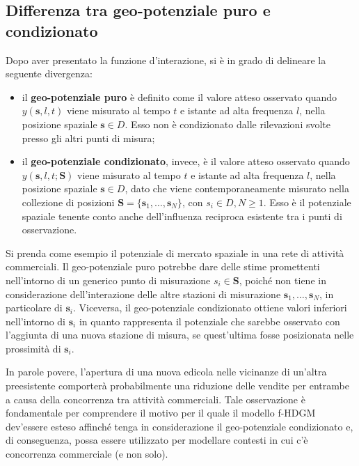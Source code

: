 \subsection[Differenza tra geo-potenziale puro e condizionato]{Differenza tra geo-potenziale puro e condizionato}
Dopo aver presentato la funzione d'interazione, si è in grado di delineare la seguente divergenza:
\begin{itemize}
	\item il \textbf{geo-potenziale puro} è definito come  il valore atteso osservato quando $y(\mathbf{s}, l, t)$ viene misurato al tempo $t$ e istante ad alta frequenza $l$, nella posizione spaziale $\mathbf{s} \in D$. Esso non è condizionato dalle rilevazioni svolte presso gli altri punti di misura;
	\item il \textbf{geo-potenziale condizionato}, invece, è il valore atteso osservato quando $y(\mathbf{s}, l, t; \mathbf{S})$
	viene misurato al tempo $t$ e istante ad alta frequenza $l$, nella posizione spaziale $\mathbf{s} \in D$, dato che viene contemporaneamente misurato nella collezione di posizioni $\mathbf{S} = \{\mathbf{s}_1, \ldots, \mathbf{s}_N\}$,  con $s_i \in D, N \geq 1$. Esso è il potenziale spaziale tenente conto anche dell'influenza reciproca esistente tra i punti di osservazione.
\end{itemize}
Si prenda come esempio il potenziale di mercato spaziale in  una rete di attività commerciali. Il geo-potenziale puro potrebbe dare delle stime promettenti nell'intorno di un generico punto di misurazione $s_i \in\mathbf{S}$, poiché non tiene in considerazione dell'interazione delle altre stazioni di misurazione $\mathbf{s}_1, \ldots, \mathbf{s}_N$, in particolare di $\mathbf{s}_i$. Viceversa, il geo-potenziale condizionato ottiene valori inferiori nell'intorno di $\mathbf{s}_i$ in quanto rappresenta il potenziale che sarebbe osservato con l'aggiunta di una  nuova stazione di misura, se quest'ultima fosse posizionata nelle prossimità di $\mathbf{s}_i$.\par In parole povere, l'apertura di una nuova edicola nelle vicinanze di un'altra preesistente comporterà probabilmente una riduzione delle vendite per entrambe a causa della concorrenza tra attività commerciali. Tale osservazione è fondamentale per comprendere il motivo per il quale il modello f-HDGM dev'essere esteso affinché tenga in considerazione il geo-potenziale condizionato e, di conseguenza, possa essere utilizzato per modellare contesti in cui c'è concorrenza commerciale (e non solo).


